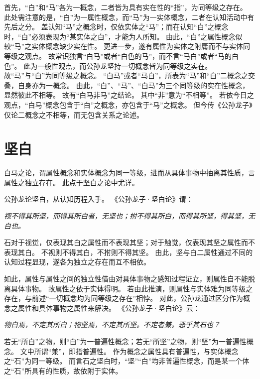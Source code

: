 \documentclass[11pt]{article}
\begin{document}
\par

首先，“白”和“马”各为一概念，二者皆为具有实在性的“指”，为同等级之存在。
此处需注意的是，“白”为一属性概念，而“马”为一实体概念，二者在认知活动中有先后之分。
盖认知“马”之概念时，仅依实体之“马”；而在认知“白”之概念时，“白”必须表现为“某实体之白”，才能为人所知。
由此，“白”之属性概念似较“马”之实体概念缺少实在性。
更进一步，遂有属性为实体之附庸而不与实体同等级之观点。
故常识独言“白马”或者“白色的马”，而不言“马白”或者“马的白色”。
此为一般性观点，而公孙龙坚持一切概念皆为同等级之实在。
故“马”与“白”为同等级之概念。
“白马”或者“马白”，所表为“马”和“白”二概念之交叠，自身亦为一概念。
由此，“白”、“马”、“白马”为三个同等级的实在性概念，显然彼此不相等。
故有“白马非马”之结论。
其中“非”意为“不相等”。
若依今日之观点，“白马”概念包含于“白”之概念，亦包含于“马”之概念。
但今传《公孙龙子》仅论二概念之不相等，而无包含关系之论述。

\section{坚白}
白马之论，谓属性概念和实体概念为同一等级，进而从具体事物中抽离其性质，言属性之独立存在。
此点于坚白之论中尤详。

\par

公孙龙论坚白，从认知历程入手。
《公孙龙子·坚白论》谓：

\textit{视不得其所坚，而得其所白者，无坚也；拊不得其所白，而得其所坚，得其坚，无白也。}

石对于视觉，仅表现其白之属性而不表现其坚；对于触觉，仅表现其坚之属性而不表现其白。
不视则不得其白，不拊则不得其坚。
由此，坚与白二属性通过不同的认知过程显现，遂各为独立之存在而互不相依。

\par

如此，属性与属性之间的独立性借由对具体事物之感知过程证立，则属性自不能脱离具体事物。
故属性之依于实体得明。
若由此推演，则属性与实体难为同等级之存在，与前述“一切概念均为同等级之存在”相悖。
对此，公孙龙通过区分作为概念之属性和具体事物之属性来解决。
《公孙龙子·坚白论》云：

\textit{物白焉，不定其所白；物坚焉，不定其所坚。不定者兼。恶乎其石也？}

若无“所白”之物，则“白”为一普遍性概念；若无“所坚”之物，则“坚”为一普遍性概念。
文中所谓“兼”，即指普遍性。
作为概念之属性具有普遍性，与实体概念之“石”为同一等级。
而言石之坚白时，“坚”“白”均非普遍性概念，而是某一个体之“石”所具有的性质，故依附于实体。
\end{document}
